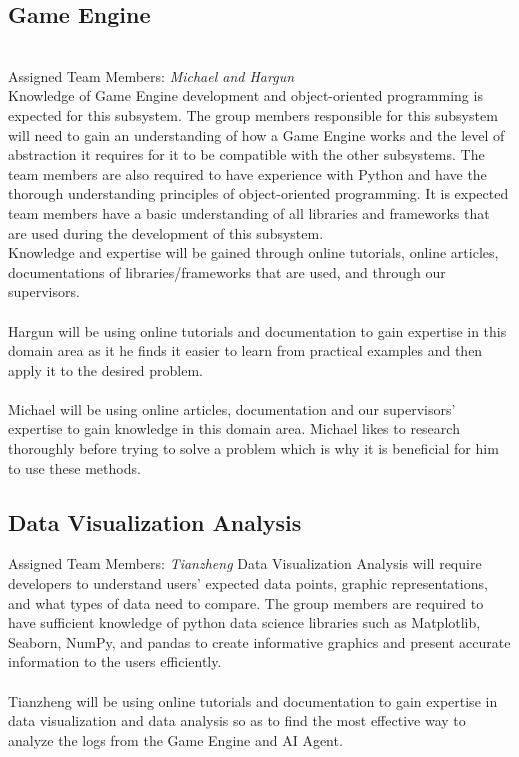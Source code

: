 \documentclass[12pt]{article}
\providecommand{\DIFaddend}{} %
\DeclareRobustCommand{\DIFaddend}{\DIFOaddend \let\includegraphics\DIFOincludegraphics} %
\begin{document}
\subsection{Game Engine}
\\
Assigned Team Members: \textit{Michael and Hargun}
\\
Knowledge of Game Engine development and object-oriented programming is expected for this subsystem. The group members responsible for this subsystem will need to gain an understanding of how a Game Engine works and the level of abstraction it requires for it to be compatible with the other subsystems. The team members are also required to have experience with Python and have the thorough understanding principles of object-oriented programming. It is expected team members have a basic understanding of all libraries and frameworks that are used during the development of this subsystem. 
\\Knowledge and expertise will be gained through online tutorials, online articles, documentations of libraries/frameworks that are used, and through our supervisors.
\\\\Hargun will be using online tutorials and documentation to gain expertise in this domain area as it he finds it easier to learn from practical examples and then apply it to the desired problem.
\\\\Michael will be using online articles, documentation and our supervisors' expertise to gain knowledge in this domain area. Michael likes to research thoroughly before trying to solve a problem which is why it is beneficial for him to use these methods.


\subsection{Data Visualization Analysis}

Assigned Team Members: \textit{Tianzheng}
Data Visualization Analysis will require developers to understand users' expected data points, graphic representations, and what types of data need to compare. The group members are required to have sufficient knowledge of python data science libraries such as Matplotlib, Seaborn, NumPy, and pandas to create informative graphics and present accurate information to the users efficiently. 
\\\\
Tianzheng will be using online tutorials and documentation to gain expertise in data visualization and data analysis so as to find the most effective way to analyze the logs from the Game Engine and AI Agent. 
\newpage


\DIFaddend 
\end{document}
